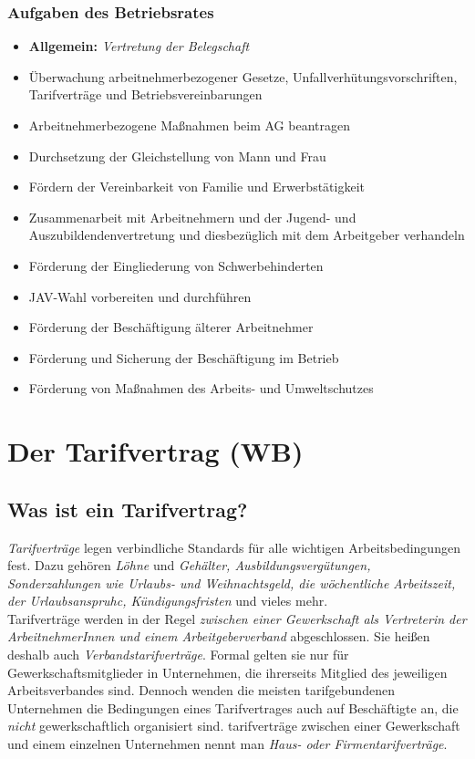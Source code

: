 \documentclass[a4paper, 12pt]{report}
\begin{document}
\subsubsection{Aufgaben des Betriebsrates}

\begin{itemize}
    \item \textbf{Allgemein:} \emph{Vertretung der Belegschaft}
    \item Überwachung arbeitnehmerbezogener Gesetze, 
        Unfallverhütungsvorschriften, Tarifverträge und Betriebsvereinbarungen
    \item Arbeitnehmerbezogene Maßnahmen beim AG beantragen
    \item Durchsetzung der Gleichstellung von Mann und Frau
    \item Fördern der Vereinbarkeit von Familie und Erwerbstätigkeit 
    \item Zusammenarbeit mit Arbeitnehmern und der Jugend- und 
        Auszubildendenvertretung und diesbezüglich mit dem Arbeitgeber 
        verhandeln
    \item Förderung der Eingliederung von Schwerbehinderten
    \item JAV-Wahl vorbereiten und durchführen
    \item Förderung der Beschäftigung älterer Arbeitnehmer
    \item Förderung und Sicherung der Beschäftigung im Betrieb
    \item Förderung von Maßnahmen des Arbeits- und Umweltschutzes
\end{itemize}

\section{Der Tarifvertrag (WB)}

\subsection{Was ist ein Tarifvertrag?}

\emph{Tarifverträge} legen verbindliche Standards für alle wichtigen 
Arbeitsbedingungen fest. Dazu gehören \emph{Löhne} und \emph{Gehälter, 
Ausbildungsvergütungen, Sonderzahlungen wie Urlaubs- und Weihnachtsgeld, die 
wöchentliche Arbeitszeit, der Urlaubsanspruhc, Kündigungsfristen} und vieles 
mehr. \\

Tarifverträge werden in der Regel \emph{zwischen einer Gewerkschaft als 
Vertreterin der ArbeitnehmerInnen und einem Arbeitgeberverband} abgeschlossen. 
Sie heißen deshalb auch \emph{Verbandstarifverträge}. Formal gelten sie nur für 
Gewerkschaftsmitglieder in Unternehmen, die ihrerseits Mitglied des jeweiligen 
Arbeitsverbandes sind. Dennoch wenden die meisten tarifgebundenen Unternehmen
die Bedingungen eines Tarifvertrages auch auf Beschäftigte an, die \emph{nicht} 
gewerkschaftlich organisiert sind. tarifverträge zwischen einer Gewerkschaft und 
einem einzelnen Unternehmen nennt man \emph{Haus- oder Firmentarifverträge}. \\
\end{document}
